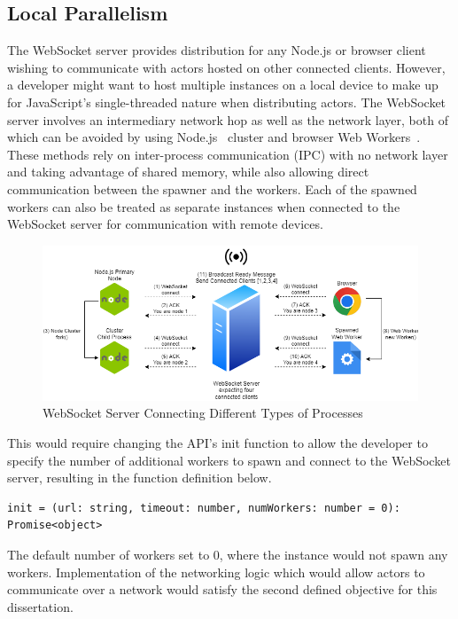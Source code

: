 \documentclass[oneside]{um-fict}
\begin{document}
\subsection{Local Parallelism}
The WebSocket server provides distribution for any Node.js or browser client wishing to communicate with actors hosted on other connected clients. However, a developer might want to host multiple instances on a local device to make up for JavaScript's single-threaded nature when distributing actors. The WebSocket server involves an intermediary network hop as well as the network layer, both of which can be avoided by using Node.js~\cite{nodejs} cluster and browser Web Workers~\cite{webworkers}. These methods rely on inter-process communication (IPC) with no network layer and taking advantage of shared memory, while also allowing direct communication between the spawner and the workers. Each of the spawned workers can also be treated as separate instances when connected to the WebSocket server for communication with remote devices.

\begin{figure}[H]
    \begin{centering}
        \includegraphics[width=\textwidth]{resources/websocketconnectioncomplex.png}
        \caption{WebSocket Server Connecting Different Types of Processes}\label{fig:websocketconnectioncomplex}
    \end{centering}
\end{figure}

This would require changing the API's init function to allow the developer to specify the number of additional workers to spawn and connect to the WebSocket server, resulting in the function definition below.
\begin{lstlisting}
init = (url: string, timeout: number, numWorkers: number = 0): Promise<object>
\end{lstlisting}
The default number of workers set to 0, where the instance would not spawn any workers. Implementation of the networking logic which would allow actors to communicate over a network would satisfy the second defined objective for this dissertation.
\end{document}
